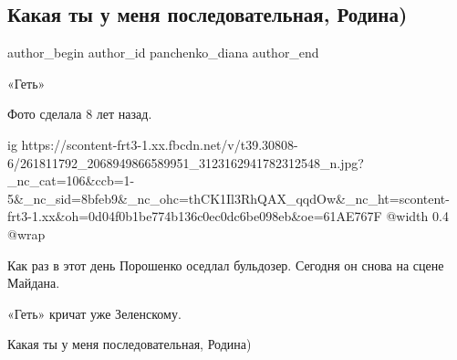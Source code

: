  
 
 
 
 
 
\subsection{Какая ты у меня последовательная, Родина)}
\label{sec:01_12_2021.fb.panchenko_diana.1.rodina_maidan}
 
\ifcmt
 author_begin
   author_id panchenko_diana
 author_end
\fi

«Геть»

Фото сделала 8 лет назад. 

\ifcmt
  ig https://scontent-frt3-1.xx.fbcdn.net/v/t39.30808-6/261811792_2068949866589951_3123162941782312548_n.jpg?_nc_cat=106&ccb=1-5&_nc_sid=8bfeb9&_nc_ohc=thCK1Il3RhQAX_qqdOw&_nc_ht=scontent-frt3-1.xx&oh=0d04f0b1be774b136c0ec0dc6be098eb&oe=61AE767F
  @width 0.4
  @wrap 
\fi

Как раз в этот день Порошенко оседлал бульдозер. Сегодня он снова на сцене
Майдана. 

«Геть» кричат уже Зеленскому. 

Какая ты у меня последовательная, Родина)
